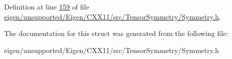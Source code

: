 Definition at line \hyperlink{eigen_2unsupported_2_eigen_2_c_x_x11_2src_2_tensor_symmetry_2_symmetry_8h_source_l00159}{159} of file \hyperlink{eigen_2unsupported_2_eigen_2_c_x_x11_2src_2_tensor_symmetry_2_symmetry_8h_source}{eigen/unsupported/\+Eigen/\+C\+X\+X11/src/\+Tensor\+Symmetry/\+Symmetry.\+h}.



The documentation for this struct was generated from the following file\+:\begin{DoxyCompactItemize}
\item 
eigen/unsupported/\+Eigen/\+C\+X\+X11/src/\+Tensor\+Symmetry/\+Symmetry.\+h\end{DoxyCompactItemize}
